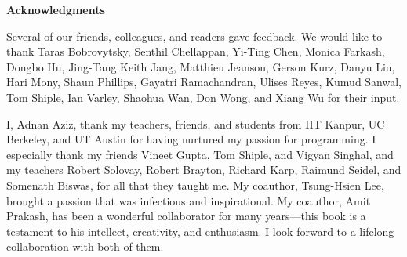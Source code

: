 \documentclass[10pt,openany,twoside,letterpaper,extrafontsizes]{memoir}
\newcommand{\blueboxheight}{10}
\begin{document}
\renewcommand{\indexname}{Index of Terms}

\footnotesize
\renewcommand{\blueboxheight}{6}
\label{terms-begin}
\printindex[terms]
\label{terms-end}


\renewcommand{\blueboxheight}{10}

\newpage
\thispagestyle{empty}

\normalsize
\begin{center}{\large \textbf{Acknowledgments}}\end{center}
\noindent


\noindent
Several of our friends, colleagues, and readers gave feedback.
We would like to thank
Taras Bobrovytsky,
Senthil Chellappan,
Yi-Ting Chen,
Monica Farkash,
Dongbo Hu,
Jing-Tang Keith Jang,
Matthieu Jeanson,
Gerson Kurz,
Danyu Liu,
Hari Mony,
Shaun Phillips,
Gayatri Ramachandran,
Ulises Reyes,
Kumud Sanwal,
Tom Shiple,
Ian Varley,
Shaohua Wan,
Don Wong, and
Xiang Wu for their input.

I, Adnan Aziz, thank my teachers, friends, and students
from IIT Kanpur, UC Berkeley, and UT Austin for having nurtured my
passion for programming. I especially thank
my friends Vineet Gupta, Tom Shiple, and Vigyan Singhal, and
my teachers Robert Solovay, Robert Brayton, Richard Karp, Raimund Seidel, and
Somenath Biswas, for all that they taught me.
My coauthor, Tsung-Hsien Lee, brought a passion that
was infectious and inspirational.
My coauthor, Amit Prakash, has been a
wonderful collaborator for many years---this book is a testament
to his intellect, creativity, and enthusiasm.
I look forward to a lifelong collaboration with both of them.
\end{document}
